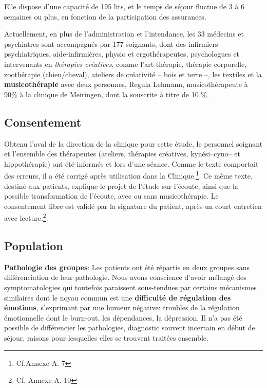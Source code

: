  
 Elle dispose d'une capacité de 195 lits, et le temps de séjour fluctue de 3 à 6 semaines ou plus, en
 fonction de la participation des assurances.
 
 Actuellement, en plus de l'administration et l'intendance, les 33
 médecins et psychiatres sont
 accompagnés par 177
 soignants, dont des infirmiers psychiatriques, aide-infirmières, physio et
 ergothérapeutes,
 psychologues et intervenants en \textit{thérapies
 	créatives}, comme l'art-thérapie, thérapie
 corporelle, zoothérapie (chien/cheval),  ateliers de créativité --
 bois et terre --,  les textiles et la\textbf{ musicothérapie} avec deux
 personnes, Regula Lehmann, musicothérapeute  à 90\%  à la clinique de Meiringen, dont la souscrite à 
 titre de 10 \%.
 
 \subsection{Consentement}
 Obtenu l'aval de la direction de la
 clinique pour cette étude,  le personnel soignant et l'ensemble des
 thérapeutes (ateliers, thérapies créatives, kynési--cyno--
 et hippothérapie) ont été  informés  et lors d'une séance. Comme le texte comportait des erreurs, il a été 
 corrigé après utilisation dans la Clinique.\footnote{Cf.Annexe A. 7}.
 Ce même texte, destiné aux
 patients, explique le projet de l'étude sur l'écoute, ainsi que la possible transformation de l'écoute,
 avec ou sans musicothérapie.
 Le consentement libre est validé par la signature du patient, après
 un court entretien avec lecture.\footnote{Cf. Annexe A. 10}.
 
 \subsection{Population}
 
 
 \textbf{ Pathologie des groupes}: Les patients ont été répartis en deux groupes sans différenciation de
 leur pathologie. Nous avons conscience d'avoir mélangé des symptomatologies qui
 toutefois paraissent
 sous-tendues par
 certains mécanismes
 similaires dont le
 noyau commun est une
 \textbf{difficulté de
 	régulation des
 	émotions},
 s'exprimant par une
 humeur négative: 
 troubles de la régulation émotionnelle
 dont le burn-out, les dépendances, la dépression.
 Il n'a pas été
 possible de différencier les pathologies, 
 diagnostic souvent incertain en début de séjour, raisons pour lesquelles elles
 se trouvent traitées ensemble.
 
